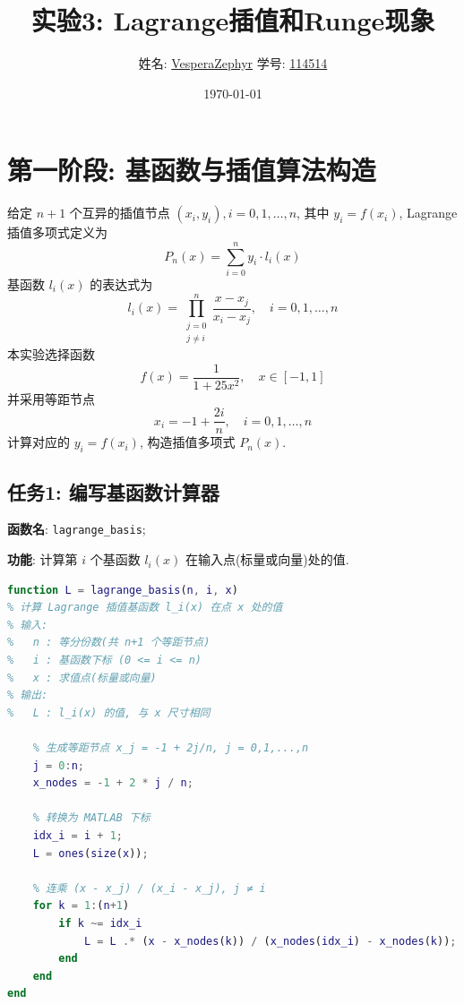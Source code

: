 \documentclass[12pt,a4paper]{ctexart}
\title{\textbf{实验3: Lagrange插值和Runge现象}}
\author{姓名: \underline{VesperaZephyr} \quad 学号: \underline{114514}}
\date{\today}
\begin{document}
\maketitle
\tableofcontents
\newpage

\section{第一阶段: 基函数与插值算法构造}
给定 $n+1$ 个互异的插值节点 $(x_i, y_i), i=0,1,\dots,n$, 其中 $y_i=f(x_i)$, Lagrange插值多项式定义为
\begin{equation}
    P_n(x) = \sum_{i=0}^{n} y_i \cdot l_i(x)
    \label{eq:lagrange}
\end{equation}
基函数 $l_i(x)$ 的表达式为
\begin{equation}
    l_i(x) = \prod_{\substack{j=0\\ j\neq i}}^{n} \frac{x-x_j}{x_i-x_j},\quad i=0,1,\dots,n
    \label{eq:basis}
\end{equation}
本实验选择函数
\begin{equation}
    f(x) = \frac{1}{1+25x^2},\quad x\in[-1,1]
\end{equation}
并采用等距节点
\begin{equation}
    x_i = -1 + \frac{2i}{n},\quad i=0,1,\dots,n
\end{equation}
计算对应的 $y_i = f(x_i)$, 构造插值多项式 $P_n(x)$. 
\subsection{任务1: 编写基函数计算器}
\textbf{函数名}: \texttt{lagrange\_basis};

\textbf{功能}: 计算第 $i$ 个基函数 $l_i(x)$ 在输入点(标量或向量)处的值. 

\begin{lstlisting}[language=Matlab, caption={基函数计算器}]
function L = lagrange_basis(n, i, x)
% 计算 Lagrange 插值基函数 l_i(x) 在点 x 处的值
% 输入: 
%   n : 等分份数(共 n+1 个等距节点)
%   i : 基函数下标 (0 <= i <= n)
%   x : 求值点(标量或向量)
% 输出: 
%   L : l_i(x) 的值, 与 x 尺寸相同

    % 生成等距节点 x_j = -1 + 2j/n, j = 0,1,...,n
    j = 0:n;
    x_nodes = -1 + 2 * j / n;

    % 转换为 MATLAB 下标
    idx_i = i + 1;
    L = ones(size(x));

    % 连乘 (x - x_j) / (x_i - x_j), j ≠ i
    for k = 1:(n+1)
        if k ~= idx_i
            L = L .* (x - x_nodes(k)) / (x_nodes(idx_i) - x_nodes(k));
        end
    end
end
\end{lstlisting}
\end{document}

